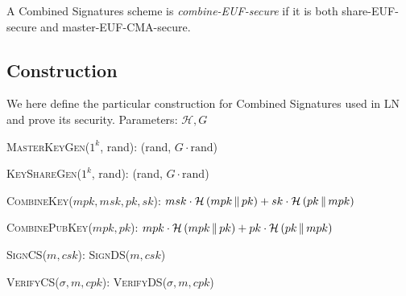  \begin{definition}
    A Combined Signatures scheme is \emph{\textsf{combine-EUF}-secure} if it
    is both \textsf{share-EUF}-secure and \textsf{master-EUF-CMA}-secure.
  \end{definition}

  \subsection{Construction}
    We here define the particular construction for Combined Signatures used in
    LN and prove its security.
    Parameters: $\mathcal{H}, G$
    \begin{algorithmic}[0]
      \State \textsc{MasterKeyGen}($1^k$, rand):
      \Indent
        \State \Return (rand, $G \cdot \mathrm{rand}$)
      \EndIndent
    \end{algorithmic}

    \begin{algorithmic}[0]
      \State \textsc{KeyShareGen}($1^k$, rand):
      \Indent
        \State \Return (rand, $G \cdot \mathrm{rand}$)
      \EndIndent
    \end{algorithmic}

    \begin{algorithmic}[0]
      \State \textsc{CombineKey}($mpk, msk, pk, sk$):
      \Indent
        \State \Return $msk \cdot \mathcal{H}\left(mpk \,\|\, pk\right) + sk
        \cdot \mathcal{H}\left(pk \,\|\, mpk\right)$
      \EndIndent
    \end{algorithmic}

    \begin{algorithmic}[0]
      \State \textsc{CombinePubKey}($mpk, pk$):
      \Indent
        \State \Return $mpk \cdot \mathcal{H}\left(mpk \,\|\, pk\right) + pk
        \cdot \mathcal{H}\left(pk \,\|\, mpk\right)$
      \EndIndent
    \end{algorithmic}

    \begin{algorithmic}[0]
      \State \textsc{SignCS}($m, csk$):
      \Indent
        \State \Return \textsc{SignDS}($m, csk$)
      \EndIndent
    \end{algorithmic}

    \begin{algorithmic}[0]
      \State \textsc{VerifyCS}($\sigma, m, cpk$):
      \Indent
        \State \Return \textsc{VerifyDS}($\sigma, m, cpk$)
      \EndIndent
    \end{algorithmic}

